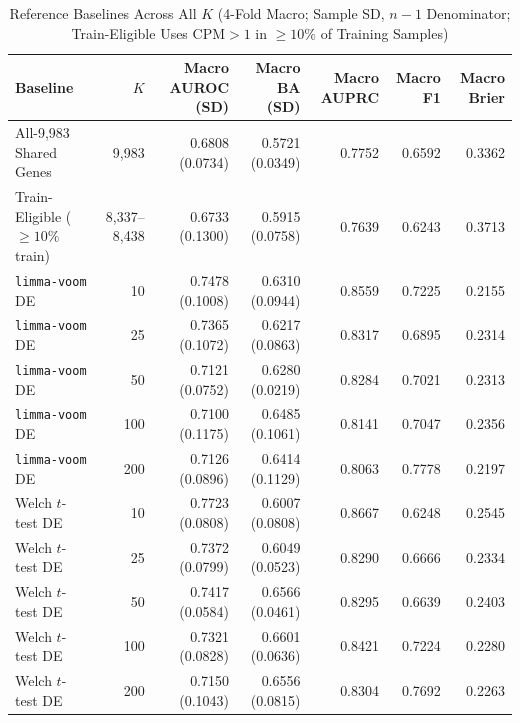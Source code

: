 \clearpage
\begin{table}[!htbp]
\centering
\caption{Reference Baselines Across All $K$ (4-Fold Macro; Sample SD, $n-1$ Denominator; Train-Eligible Uses $\mathrm{CPM}>1$ in $\ge 10\%$ of Training Samples)}
\label{tab:s2}
\footnotesize
\renewcommand{\arraystretch}{1.12}
\begin{tabular}{@{}lrrrrrr@{}}
\toprule
Baseline & $K$ & Macro AUROC (SD) & Macro BA (SD) & Macro AUPRC & Macro F1 & Macro Brier \\
\midrule
All-9,983 Shared Genes & 9,983 & 0.6808 (0.0734) & 0.5721 (0.0349) & 0.7752 & 0.6592 & 0.3362 \\
Train-Eligible ($\ge 10\%$ train) & 8,337--8,438 & 0.6733 (0.1300) & 0.5915 (0.0758) & 0.7639 & 0.6243 & 0.3713 \\
\texttt{limma-voom} DE & 10 & 0.7478 (0.1008) & 0.6310 (0.0944) & 0.8559 & 0.7225 & 0.2155 \\
\texttt{limma-voom} DE & 25 & 0.7365 (0.1072) & 0.6217 (0.0863) & 0.8317 & 0.6895 & 0.2314 \\
\texttt{limma-voom} DE & 50 & 0.7121 (0.0752) & 0.6280 (0.0219) & 0.8284 & 0.7021 & 0.2313 \\
\texttt{limma-voom} DE & 100 & 0.7100 (0.1175) & 0.6485 (0.1061) & 0.8141 & 0.7047 & 0.2356 \\
\texttt{limma-voom} DE & 200 & 0.7126 (0.0896) & 0.6414 (0.1129) & 0.8063 & 0.7778 & 0.2197 \\
Welch $t$-test DE & 10 & 0.7723 (0.0808) & 0.6007 (0.0808) & 0.8667 & 0.6248 & 0.2545 \\
Welch $t$-test DE & 25 & 0.7372 (0.0799) & 0.6049 (0.0523) & 0.8290 & 0.6666 & 0.2334 \\
Welch $t$-test DE & 50 & 0.7417 (0.0584) & 0.6566 (0.0461) & 0.8295 & 0.6639 & 0.2403 \\
Welch $t$-test DE & 100 & 0.7321 (0.0828) & 0.6601 (0.0636) & 0.8421 & 0.7224 & 0.2280 \\
Welch $t$-test DE & 200 & 0.7150 (0.1043) & 0.6556 (0.0815) & 0.8304 & 0.7692 & 0.2263 \\
\bottomrule
\end{tabular}
\end{table}

